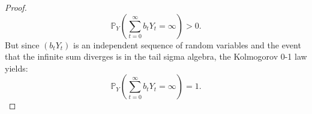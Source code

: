 \documentclass[10pt,a4paper]{amsart}
\newcommand{\N}{\mathbb{N}}
\begin{document}
\begin{proof}
    \[\mathbb P_Y(\sum_{t=0}^\infty b_tY_t=\infty)>0.\]
    But since $(b_tY_t)$ is an independent sequence of random variables and the event that the infinite sum diverges is in the tail sigma algebra, the Kolmogorov 0-1 law yields:
    \[\mathbb P_Y(\sum_{t=0}^\infty b_tY_t=\infty)=1.\]
\end{proof}
\end{document}
